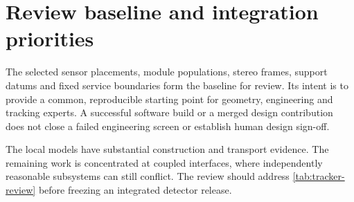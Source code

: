 \section{Review baseline and integration priorities}
\label{sec:tracker-review}
The selected sensor placements, module populations, stereo frames, support
datums and fixed service boundaries form the baseline for review. Its intent is
to provide a common, reproducible starting point for geometry, engineering and
tracking experts. A successful software build or a merged design contribution
does not close a failed engineering screen or establish human design sign-off.

The local models have substantial construction and transport evidence. The
remaining work is concentrated at coupled interfaces, where independently
reasonable subsystems can still conflict. The review should address
\cref{tab:tracker-review} before freezing an integrated detector release.


